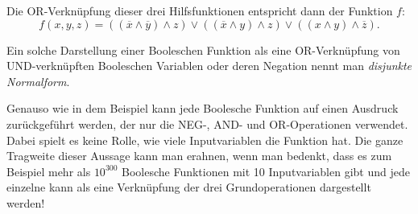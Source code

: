 \begin{myexample}
   Die OR-Verknüpfung dieser drei Hilfsfunktionen entspricht dann der Funktion $f$:
   $$f(x,y,z) = ((\overline{x} \wedge \overline{y}) \wedge z) \vee ((\overline{x} \wedge y )\wedge z) \vee ((x \wedge y) \wedge \overline{z}).$$

   Ein solche Darstellung einer Booleschen Funktion als eine OR-Verknüpfung von UND-ver\-knüpf\-ten Booleschen Variablen oder deren Negation nennt man \emph{disjunkte Normalform}.
\end{myexample}

Genauso wie in dem Beispiel kann jede Boolesche Funktion auf einen Ausdruck zurückgeführt werden, der nur die NEG-, AND- und OR-Operationen verwendet. Dabei spielt es keine Rolle, wie viele Inputvariablen die Funktion hat. Die ganze Tragweite dieser Aussage kann man erahnen, wenn man bedenkt, dass es zum Beispiel mehr als $10^{300}$ Boolesche Funktionen mit 10 Inputvariablen gibt und jede einzelne kann als eine Verknüpfung der drei Grundoperationen dargestellt werden!

